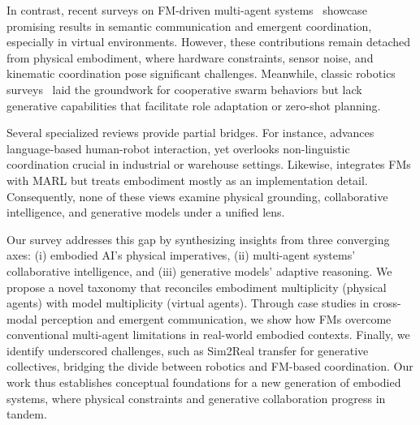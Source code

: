 In contrast, recent surveys on FM-driven multi-agent systems~\cite{guo2024large,chen2024survey,lu2024merge} showcase promising results in semantic communication and emergent coordination, especially in virtual environments. 
However, these contributions remain detached from physical embodiment, where hardware constraints, sensor noise, and kinematic coordination pose significant challenges. 
Meanwhile, classic robotics surveys~\cite{ismail2018survey,yan2013survey} laid the groundwork for cooperative swarm behaviors but lack generative capabilities that facilitate role adaptation or zero-shot planning.

Several specialized reviews provide partial bridges. 
For instance, \cite{hunt2024survey} advances language-based human-robot interaction, yet overlooks non-linguistic coordination crucial in industrial or warehouse settings. 
Likewise, \cite{sun2024llm} integrates FMs with MARL but treats embodiment mostly as an implementation detail. 
Consequently, none of these views examine physical grounding, collaborative intelligence, and generative models under a unified lens.

Our survey addresses this gap by synthesizing insights from three converging axes: 
(i) embodied AI’s physical imperatives, 
(ii) multi-agent systems’ collaborative intelligence, and 
(iii) generative models’ adaptive reasoning. 
We propose a novel taxonomy that reconciles embodiment multiplicity (physical agents) with model multiplicity (virtual agents). 
Through case studies in cross-modal perception and emergent communication, we show how FMs overcome conventional multi-agent limitations in real-world embodied contexts. 
Finally, we identify underscored challenges, such as Sim2Real transfer for generative collectives, bridging the divide between robotics and FM-based coordination. 
Our work thus establishes conceptual foundations for a new generation of embodied systems, where physical constraints and generative collaboration progress in tandem.

%